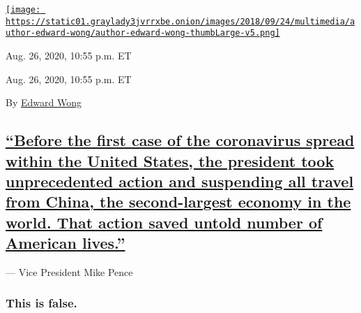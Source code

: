 \href{https://www.nytimes3xbfgragh.onion/by/edward-wong}{\texttt{[image: https://static01.graylady3jvrrxbe.onion/images/2018/09/24/multimedia/author-edward-wong/author-edward-wong-thumbLarge-v5.png]}}

Aug. 26, 2020, 10:55 p.m. ET

Aug. 26, 2020, 10:55 p.m. ET

By \href{https://www.nytimes3xbfgragh.onion/by/edward-wong}{Edward Wong}

\hypertarget{before-the-first-case-of-the-coronavirus-spread-within-the-united-states-the-president-took-unprecedented-action-and-suspending-all-travel-from-china-the-second-largest-economy-in-the-world-that-action-saved-untold-number-of-american-lives}{%
\subsection{\texorpdfstring{\protect\hyperlink{before-the-first-case-of-the-coronavirus-spread-within-the-united-states-the-president-took-unprecedented-action-and-suspending-}{``Before
the first case of the coronavirus spread within the United States, the
president took unprecedented action and suspending all travel from
China, the second-largest economy in the world. That action saved untold
number of American
lives.''}}{``Before the first case of the coronavirus spread within the United States, the president took unprecedented action and suspending all travel from China, the second-largest economy in the world. That action saved untold number of American lives.''}}\label{before-the-first-case-of-the-coronavirus-spread-within-the-united-states-the-president-took-unprecedented-action-and-suspending-all-travel-from-china-the-second-largest-economy-in-the-world-that-action-saved-untold-number-of-american-lives}}

--- Vice President Mike Pence

\hypertarget{this-is-false-1}{%
\subsubsection{This is false.}\label{this-is-false-1}}

